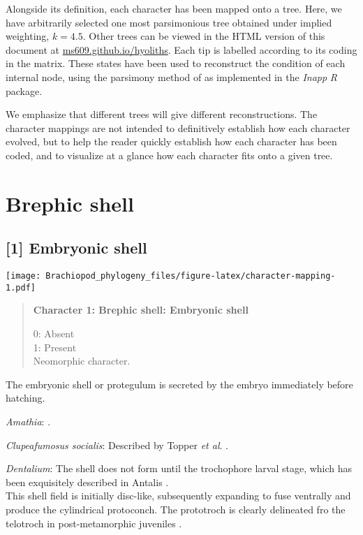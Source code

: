 \documentclass[openany]{book}
\theoremstyle{definition}
\theoremstyle{definition}
\theoremstyle{definition}
\theoremstyle{remark}
\begin{document}
Alongside its definition, each character has been mapped onto a tree.
Here, we have arbitrarily selected one most parsimonious tree obtained
under implied weighting, \(k = 4.5\). Other trees can be viewed in the
HTML version of this document at
\href{https://ms609.github.io/hyoliths/reconstructions.html}{ms609.github.io/hyoliths}.
Each tip is labelled according to its coding in the matrix. These states
have been used to reconstruct the condition of each internal node, using
the parsimony method of \citet{Brazeau2018} as implemented in the
\emph{Inapp} \emph{R} package.

We emphasize that different trees will give different reconstructions.
The character mappings are not intended to definitively establish how
each character evolved, but to help the reader quickly establish how
each character has been coded, and to visualize at a glance how each
character fits onto a given tree.

\section{Brephic shell}\label{brephic-shell}

\subsection*{{[}1{]} Embryonic shell}\label{embryonic-shell}

\texttt{[image: Brachiopod\_phylogeny\_files/figure-latex/character-mapping-1.pdf]}

\begin{quote}
\textbf{Character 1: Brephic shell: Embryonic shell}

0: Absent\\
1: Present\\
Neomorphic character.
\end{quote}

The embryonic shell or protegulum is secreted by the embryo immediately
before hatching.

\hypertarget{Amathia-coding-1}{}
\emph{Amathia}: \citet{Reed1982}.

\hypertarget{Clupeafumosus_socialis-coding-1}{}
\emph{Clupeafumosus socialis}: Described by Topper \emph{et al}.
\citeyearpar{Topper2013Reappraisalof}.

\hypertarget{Dentalium-coding-1}{}
\emph{Dentalium}: The shell does not form until the trochophore larval
stage, which has been exquisitely described in Antalis
\citep{Wanninger2001}.\\
This shell field is initially disc-like, subsequently expanding to fuse
ventrally and produce the cylindrical protoconch. The prototroch is
clearly delineated fro the telotroch in post-metamorphic juveniles
\citep{Wanninger2001}.
\end{document}
